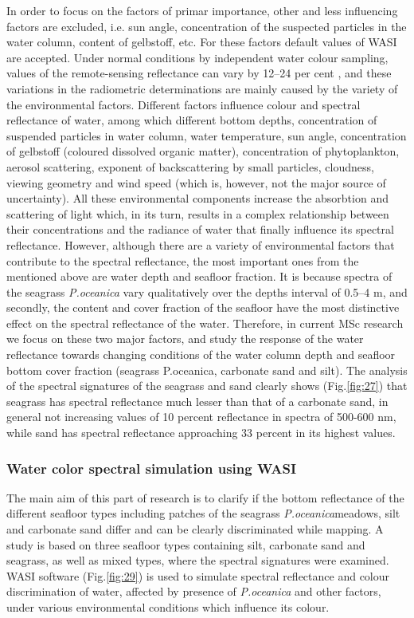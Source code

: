 \documentclass[10pt, a4paper]{article}
\begin{document}
In order to focus on the factors of primar importance, other and less influencing factors are excluded,
i.e. sun angle, concentration of the suspected particles in the water column, content of gelbstoff, etc.
For these factors default values of WASI are accepted.
Under normal conditions by independent water colour sampling, values of the remote-sensing
reflectance can vary by 12–24 per cent \cite{Toole00}\label{Toole00}, and these variations in the radiometric
determinations are mainly caused by the variety of the environmental factors.
Different factors influence colour and spectral reflectance of water, among which different bottom
depths, concentration of suspended particles in water column, water temperature, sun angle,
concentration of gelbstoff (coloured dissolved organic matter), concentration of phytoplankton,
aerosol scattering, exponent of backscattering by small particles, cloudness, viewing geometry and
wind speed (which is, however, not the major source of uncertainty). All these environmental
components increase the absorbtion and scattering of light which, in its turn, results in a complex
relationship between their concentrations and the radiance of water that finally influence its spectral
reflectance.
However, although there are a variety of environmental factors that contribute to the spectral
reflectance, the most important ones from the mentioned above are water depth and seafloor fraction.
It is because spectra of the seagrass \textit{P.oceanica} vary qualitatively over the depths interval of 0.5–4 m,
and secondly, the content and cover fraction of the seafloor have the most distinctive effect on the
spectral reflectance of the water.
Therefore, in current MSc research we focus on these two major factors, and study the response of the
water reflectance towards changing conditions of the water column depth and seafloor bottom cover
fraction (seagrass P.oceanica, carbonate sand and silt).
The analysis of the spectral signatures of the seagrass and sand clearly shows (Fig.\ref{fig:27}) that seagrass
has spectral reflectance much lesser than that of a carbonate sand, in general not increasing values of
10 percent reflectance in spectra of 500-600 nm, while sand has spectral reflectance approaching 33 percent in its
highest values.

\subsubsection{Water color spectral simulation using WASI}
The main aim of this part of research is to clarify if the bottom reflectance of the different seafloor types including patches of
the seagrass \textit{P.oceanica}meadows, silt and carbonate sand differ and can be clearly discriminated while mapping. A study is
based on three seafloor types containing silt, carbonate sand and seagrass, as well as mixed
types, where the spectral signatures were examined. WASI software (Fig.\ref{fig:29}) is used to simulate
spectral reflectance and colour discrimination of water, affected by presence of \textit{P.oceanica} and other factors, under various
environmental conditions which influence its colour.
\end{document}
